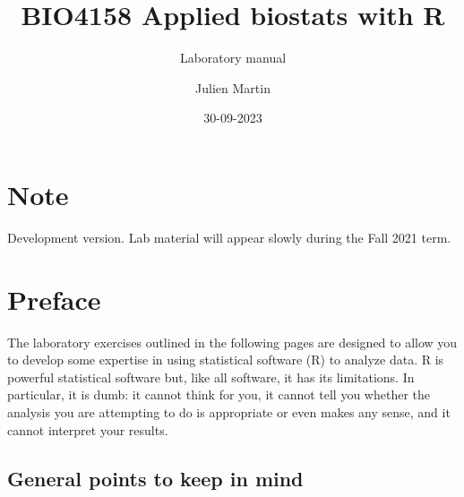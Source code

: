 \documentclass[
  12pt,
]{book}
\title{BIO4158 Applied biostats with R}
\subtitle{Laboratory manual}
\author{Julien Martin}
\date{30-09-2023}
\begin{document}
\maketitle



{
\setcounter{tocdepth}{1}
\tableofcontents
}
\hypertarget{note}{%
\chapter*{Note}\label{note}}

Development version. Lab material will appear slowly during the Fall 2021 term.

\hypertarget{preface}{%
\chapter*{Preface}\label{preface}}

The laboratory exercises outlined in the following pages are designed to allow you to develop some expertise in using statistical software (R)
to analyze data. R is powerful statistical software but, like all software, it has its limitations. In particular, it is dumb: it cannot think for you,
it cannot tell you whether the analysis you are attempting to do is appropriate or even makes any sense, and it cannot interpret your
results.

\hypertarget{general-points-to-keep-in-mind}{%
\section*{General points to keep in mind}\label{general-points-to-keep-in-mind}}
\end{document}
